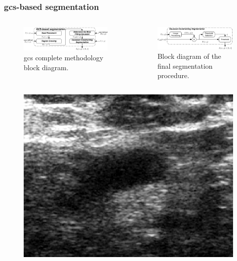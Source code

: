\begin{frame}\frametitle{\acf{gcs}-based segmentation}\tiny
\begin{columns}
\begin{column}{.5\textwidth}
\begin{figure}[Htb]%
\setlength{\abovecaptionskip}{2pt}
\centering
\includegraphics[trim=2 0 2 2, clip,width=\textwidth]{IWDMmethodDiagram}
\caption{{\tiny \ac{gcs} complete methodology block diagram.}}
\label{fig:methodDiagram}
\end{figure}
\end{column}
\vspace{-5pt}
\begin{column}{.55\textwidth}
\begin{figure}[Htb]%
\setlength{\abovecaptionskip}{2pt}
\centering
\includegraphics[trim= 0 5 0 0, clip,width=.8\textwidth]{mscThesis/gcs_ref2.pdf}
\caption{{\tiny Block diagram of the final segmentation procedure.}}
\label{fig:gcs}
\end{figure}
\end{column}
\end{columns}
\vspace{-10pt}
\centering
\begin{figure}[Htbp]
\centering
\includegraphics[trim= 0 5 0 10, clip,height=.24\textwidth]{mscThesis/Sono.png}~

\end{figure}
\end{frame}
